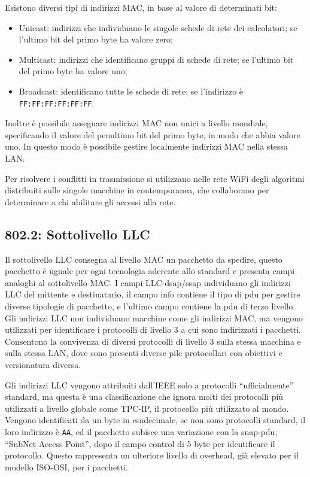 \documentclass{article}
\numberwithin{equation}{subsection}
\begin{document}
Esistono diversi tipi di indirizzi MAC, in base al valore di determinati bit:
\begin{itemize}
  \item Unicast: indirizzi che individuano le singole schede di rete dei calcolatori; se l'ultimo bit del primo byte ha valore zero;
  \item Multicast: indirizzi che identificano gruppi di schede di rete; se l'ultimo bit del primo byte ha valore uno;
  \item Broadcast: identificano tutte le schede di rete; se l'indirizzo è \verb|FF:FF:FF:FF:FF:FF|.  
\end{itemize}

Inoltre è possibile assegnare indirizzi MAC non unici a livello mondiale, specificando il valore del penultimo bit del primo byte, in modo che abbia valore uno. In questo modo è possibile gestire localmente indirizzi 
MAC nella stessa LAN. 

Per risolvere i conflitti in trasmissione si utilizzano nelle rete WiFi degli algoritmi distribuiti sulle singole macchine in contemporanea, che collaborano per determinare a chi abilitare gli accessi alla rete. 

\subsection{802.2: Sottolivello LLC}

Il sottolivello LLC consegna al livello MAC un pacchetto da spedire, questo pacchetto è uguale per ogni tecnologia aderente allo standard e presenta campi analoghi al sottolivello MAC. I campi LLC-dsap/ssap individuano 
gli indirizzi LLC del mittente e destinatario, il campo info contiene il tipo di pdu per gestire diverse tipologie di pacchetto, e l'ultimo campo contiene la pdu di terzo livello. 
Gli indirizzi LLC non individuano macchine come gli indirizzi MAC, ma vengono utilizzati per identificare i protocolli di livello 3 a cui sono indirizzati i pacchetti. Consentono la convivenza di diversi protocolli 
di livello 3 sulla stessa macchina e sulla stessa LAN, dove sono presenti diverse pile protocollari con obiettivi e versionatura diversa. 

Gli indirizzi LLC vengono attribuiti dall'IEEE solo a protocolli ``ufficialmente'' standard, ma questa è una classificazione che ignora molti dei protocolli più utilizzati a livello globale come TPC-IP, il 
protocollo più utilizzato al mondo. Vengono identificati da un byte in esadecimale, se non sono protocolli standard, il loro indirizzo è \verb|AA|, ed il pacchetto subisce una variazione con la snap-pdu, 
``SubNet Access Point'', dopo il campo control di 5 byte per identificare il protocollo. Questo rappresenta un ulteriore livello di overhead, già elevato per il modello ISO-OSI, per i pacchetti. 
\end{document}
